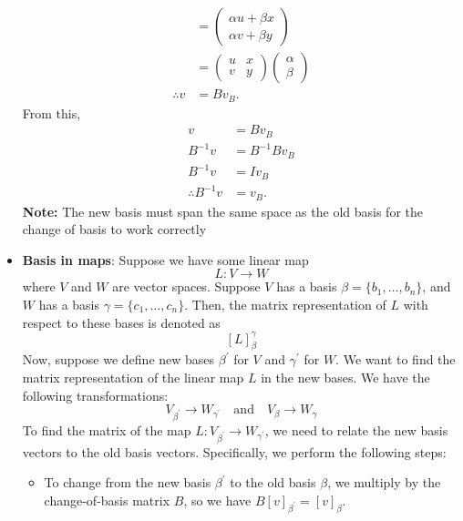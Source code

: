 \documentclass{report}
\begin{document}
\begin{itemize}
\begin{align*}
                                                     &= \begin{pmatrix} \alpha u + \beta x \\ \alpha v + \beta y \end{pmatrix} \\
                                                     &= \begin{pmatrix} u & x \\ v & y \end{pmatrix}\begin{pmatrix} \alpha \\ \beta \end{pmatrix} \\
                \therefore v &= Bv_{B}
            .\end{align*}
            From this, 
            \begin{align*}
                v & = Bv_{B} \\
                B^{-1}v &= B^{-1}Bv_{B} \\
                B^{-1}v &= I v_{B} \\
                \therefore B^{-1}v &= v_{B}
            .\end{align*}
            \bigbreak \noindent 
            \textbf{Note:} The new basis must span the same space as the old basis for the change of basis to work correctly
        \item \textbf{Basis in maps}: Suppose we have some linear map
            \[
                L: V \to W
            \]
            where \(V\) and \(W\) are vector spaces. Suppose \(V\) has a basis \(\beta = \{b_{1}, \dots, b_{n}\}\), and \(W\) has a basis \(\gamma = \{c_{1}, \dots, c_{n}\}\). Then, the matrix representation of \(L\) with respect to these bases is denoted as
            \[
                [L]_{\beta}^{\gamma}
            \]
            Now, suppose we define new bases \(\beta^{\prime}\) for \(V\) and \(\gamma^{\prime}\) for \(W\). We want to find the matrix representation of the linear map \(L\) in the new bases.
            \bigbreak \noindent 
            We have the following transformations:
            \[
                V_{\beta^{\prime}} \to W_{\gamma^{\prime}} \quad \text{and} \quad V_{\beta} \to W_{\gamma}
            \]
            To find the matrix of the map \(L: V_{\beta^{\prime}} \to W_{\gamma^{\prime}}\), we need to relate the new basis vectors to the old basis vectors. Specifically, we perform the following steps:
            \begin{itemize}
                \item To change from the new basis \(\beta^{\prime}\) to the old basis \(\beta\), we multiply by the change-of-basis matrix \(B\), so we have \(B[v]_{\beta^{\prime}} = [v]_{\beta}\).

\end{itemize}
\end{itemize}
\end{document}
